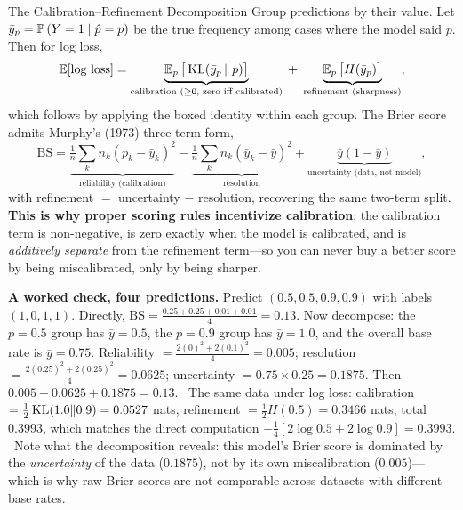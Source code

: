 \begin{mathresult}{The Calibration--Refinement Decomposition}
Group predictions by their value. Let $\bar y_p = \mathbb{P}\left(Y=1 \mid \hat p = p\right)$ be the true frequency among cases where the model said $p$. Then for log loss,
\begin{equation}
\operatorname{\mathbb{E}}[\text{log loss}] = \underbrace{\operatorname{\mathbb{E}}_p\big[\operatorname{KL}(\bar y_p \,\|\, p)\big]}_{\text{calibration (}\ge 0\text{, zero iff calibrated)}} \;+\; \underbrace{\operatorname{\mathbb{E}}_p\big[H(\bar y_p)\big]}_{\text{refinement (sharpness)}} ,
\end{equation}
which follows by applying the boxed identity within each group. The Brier score admits Murphy's (1973) three-term form,
\begin{equation}
\text{BS} = \underbrace{\tfrac{1}{n}\textstyle\sum_k n_k(p_k - \bar y_k)^2}_{\text{reliability (calibration)}} - \underbrace{\tfrac{1}{n}\textstyle\sum_k n_k(\bar y_k - \bar y)^2}_{\text{resolution}} + \underbrace{\bar y(1-\bar y)}_{\text{uncertainty (data, not model)}} ,
\end{equation}
with refinement $=$ uncertainty $-$ resolution, recovering the same two-term split. \textbf{This is why proper scoring rules incentivize calibration}: the calibration term is non-negative, is zero exactly when the model is calibrated, and is \textit{additively separate} from the refinement term---so you can never buy a better score by being miscalibrated, only by being sharper.
\end{mathresult}

\textbf{A worked check, four predictions.} Predict $(0.5, 0.5, 0.9, 0.9)$ with labels $(1,0,1,1)$. Directly, $\text{BS} = \frac{0.25+0.25+0.01+0.01}{4} = 0.13$. Now decompose: the $p=0.5$ group has $\bar y = 0.5$, the $p=0.9$ group has $\bar y = 1.0$, and the overall base rate is $\bar y = 0.75$. Reliability $= \frac{2(0)^2 + 2(0.1)^2}{4} = 0.005$; resolution $= \frac{2(0.25)^2 + 2(0.25)^2}{4} = 0.0625$; uncertainty $= 0.75 \times 0.25 = 0.1875$. Then $0.005 - 0.0625 + 0.1875 = 0.13$. \checkmark\ The same data under log loss: calibration $= \tfrac{1}{2}\operatorname{KL}(1.0\|0.9) = 0.0527$ nats, refinement $= \tfrac{1}{2}H(0.5) = 0.3466$ nats, total $0.3993$, which matches the direct computation $-\tfrac{1}{4}[2\log 0.5 + 2\log 0.9] = 0.3993$. \checkmark\ Note what the decomposition reveals: this model's Brier score is dominated by the \textit{uncertainty} of the data ($0.1875$), not by its own miscalibration ($0.005$)---which is why raw Brier scores are not comparable across datasets with different base rates.


